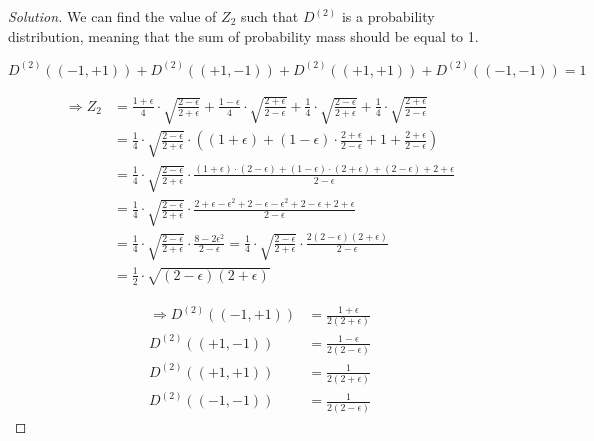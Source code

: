 \documentclass{article}
\newcommand{\<}{\langle}
\renewcommand{\>}{\rangle}
\theoremstyle{definition}
\newcommand{\dtw}{D^{(2)}}
\newcommand{\ztw}{Z_{2}}
\begin{document}
\begin{proof}[Solution]
We can find the value of $\ztw$ such that $\dtw$ is a probability distribution,
meaning that the sum of probability mass should be equal to 1.

\[\dtw((-1, +1)) + \dtw((+1, -1)) + \dtw((+1, +1)) + \dtw((-1, -1)) = 1\]

\begin{align*}
\Rightarrow \ztw &=
  \frac{1+\epsilon}{4} \cdot \sqrt{\frac{2-\epsilon}{2+\epsilon}} +
  \frac{1-\epsilon}{4} \cdot \sqrt{\frac{2+\epsilon}{2-\epsilon}} +
  \frac{1}{4} \cdot \sqrt{\frac{2-\epsilon}{2+\epsilon}} +
  \frac{1}{4} \cdot \sqrt{\frac{2+\epsilon}{2-\epsilon}} \\
&=\frac{1}{4} \cdot \sqrt{\frac{2-\epsilon}{2+\epsilon}} \cdot \left(
    (1+\epsilon) +
    (1-\epsilon) \cdot \frac{2+\epsilon}{2-\epsilon} +
    1 +
    \frac{2+\epsilon}{2-\epsilon}
  \right) \\
&=\frac{1}{4} \cdot \sqrt{\frac{2-\epsilon}{2+\epsilon}} \cdot
  \frac{(1+\epsilon)\cdot(2-\epsilon) +
  (1-\epsilon)\cdot(2+\epsilon) +
  (2-\epsilon) +
  2+\epsilon}{2-\epsilon} \\
&=\frac{1}{4} \cdot \sqrt{\frac{2-\epsilon}{2+\epsilon}} \cdot
  \frac{2 + \epsilon - \epsilon^2 +
        2 - \epsilon - \epsilon^2 +
        2 - \epsilon +
        2 + \epsilon}{2-\epsilon} \\
&=\frac{1}{4} \cdot \sqrt{\frac{2-\epsilon}{2+\epsilon}} \cdot
  \frac{8 - 2\epsilon^2}{2-\epsilon}
 =\frac{1}{4} \cdot \sqrt{\frac{2-\epsilon}{2+\epsilon}} \cdot
  \frac{2(2-\epsilon)(2+\epsilon)}{2-\epsilon} \\
&=\frac{1}{2} \cdot \sqrt{(2-\epsilon)(2+\epsilon)}
\end{align*}

\begin{minipage}[b]{0.5\textwidth}
\begin{align*}
\Rightarrow
\dtw((-1, +1)) &= \frac{1+\epsilon}{2(2+\epsilon)} \\
\dtw((+1, -1)) &= \frac{1-\epsilon}{2(2-\epsilon)} \\
\dtw((+1, +1)) &= \frac{1}{2(2+\epsilon)} \\
\dtw((-1, -1)) &= \frac{1}{2(2-\epsilon)}
\end{align*}
\end{minipage}
\begin{minipage}[b]{0.4\textwidth}
\end{minipage}


\end{proof}
\end{document}
